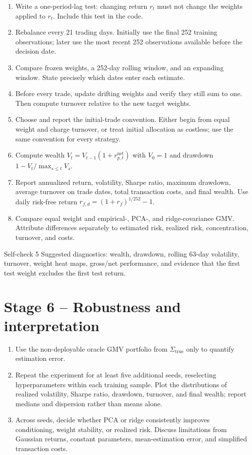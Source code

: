 \documentclass[10pt]{article}
\begin{document}
\begin{enumerate}[label=\textbf{5.\arabic*.}]
\item Write a one-period-lag test: changing return $r_t$ must not change the
weights applied to $r_t$. Include this test in the code.
\item Rebalance every 21 trading days. Initially use the final 252 training
observations; later use the most recent 252 observations available before the
decision date.
\item Compare frozen weights, a 252-day rolling window, and an expanding
window. State precisely which dates enter each estimate.
\item Before every trade, update drifting weights and verify they still sum to
one. Then compute turnover relative to the new target weights.
\item Choose and report the initial-trade convention. Either begin from equal
weight and charge turnover, or treat initial allocation as costless; use the
same convention for every strategy.
\item Compute wealth $V_t=V_{t-1}(1+r_{p,t}^{\mathrm{net}})$ with $V_0=1$ and
drawdown $1-V_t/\max_{s\leq t}V_s$.
\item Report annualized return, volatility, Sharpe ratio, maximum drawdown,
average turnover on trade dates, total transaction costs, and final wealth.
Use daily risk-free return $r_{f,d}=(1+r_f)^{1/252}-1$.
\item Compare equal weight and empirical-, PCA-, and ridge-covariance GMV.
Attribute differences separately to estimated risk, realized risk,
concentration, turnover, and costs.
\end{enumerate}

\begin{checkpointbox}{Self-check 5}
Suggested diagnostics: wealth, drawdown, rolling 63-day volatility, turnover,
weight heat maps, gross/net performance, and evidence that the first test
weight excludes the first test return.
\end{checkpointbox}

\section{Stage 6 -- Robustness and interpretation}
\enlargethispage{\baselineskip}

\begin{enumerate}[label=\textbf{6.\arabic*.}]
\item Use the non-deployable oracle GMV portfolio from
$\Sigma_{\mathrm{true}}$ only to quantify estimation error.
\item Repeat the experiment for at least five additional seeds, reselecting
hyperparameters within each training sample. Plot the distributions of realized
volatility, Sharpe ratio, drawdown, turnover, and final wealth; report medians
and dispersion rather than means alone.
\item Across seeds, decide whether PCA or ridge consistently improves
conditioning, weight stability, or realized risk. Discuss limitations from
Gaussian returns, constant parameters, mean-estimation error, and simplified
transaction costs.
\end{enumerate}
\end{document}
